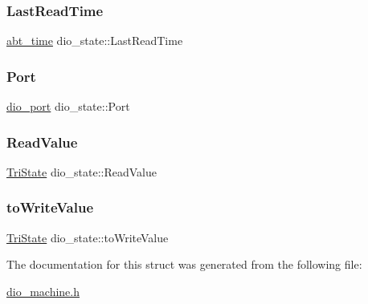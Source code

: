 \subsubsection{\texorpdfstring{Last\+Read\+Time}{LastReadTime}}
{\footnotesize\ttfamily \hyperlink{ab__time_8h_adc59735fd0d20e93fe3016c8b6a4f782}{abt\+\_\+time} dio\+\_\+state\+::\+Last\+Read\+Time}

\mbox{\label{structdio__state_a9e0dd820a840b52e4696c5f782b0be25}} 
\subsubsection{\texorpdfstring{Port}{Port}}
{\footnotesize\ttfamily \hyperlink{structdio__port}{dio\+\_\+port} dio\+\_\+state\+::\+Port}

\mbox{\label{structdio__state_aaa849b5fd1e89616a2a0ad749231f3eb}} 
\subsubsection{\texorpdfstring{Read\+Value}{ReadValue}}
{\footnotesize\ttfamily \hyperlink{adsio_8h_a20884447391b4598296c73c6fa3d9470}{Tri\+State} dio\+\_\+state\+::\+Read\+Value}

\mbox{\label{structdio__state_a814fbbc0fd796a5aa5069c5e2da472ad}} 
\subsubsection{\texorpdfstring{to\+Write\+Value}{toWriteValue}}
{\footnotesize\ttfamily \hyperlink{adsio_8h_a20884447391b4598296c73c6fa3d9470}{Tri\+State} dio\+\_\+state\+::to\+Write\+Value}



The documentation for this struct was generated from the following file\+:\begin{DoxyCompactItemize}
\item 
\hyperlink{dio__machine_8h}{dio\+\_\+machine.\+h}\end{DoxyCompactItemize}
